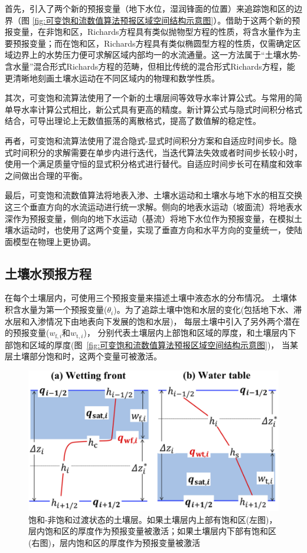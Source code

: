 首先，引入了两个新的预报变量（地下水位，湿润锋面的位置）来追踪饱和区的边界（图 \ref{fig:可变饱和流数值算法预报区域空间结构示意图}）。借助于这两个新的预报变量，在非饱和区，Richards方程具有类似抛物型方程的性质，将含水量作为主要预报变量；而在饱和区，Richards方程具有类似椭圆型方程的性质，仅需确定区域边界上的水势压力便可求解区域内部均一的水流通量。这一方法属于“土壤水势-含水量”混合形式Richards方程的范畴，但相比传统的混合形式Richards方程，能更清晰地刻画土壤水运动在不同区域内的物理和数学性质。

其次，可变饱和流算法使用了一个新的土壤层间等效导水率计算公式。与常用的简单导水率计算公式相比，新公式具有更高的精度。新计算公式与隐式时间积分格式结合，可导出理论上无数值振荡的离散格式，提高了数值解的稳定性。

再者，可变饱和流算法使用了混合隐式-显式时间积分方案和自适应时间步长。隐式时间积分的求解需要在单步内进行迭代，当迭代算法失效或者时间步长较小时，使用一个满足质量守恒的显式积分格式进行替代。自适应时间步长可在精度和效率之间做出合理的平衡。

最后，可变饱和流数值算法将地表入渗、土壤水运动和土壤水与地下水的相互交换这三个垂直方向的水流运动进行统一求解。侧向的地表水运动（坡面流）将地表水深作为预报变量，侧向的地下水运动（基流）将地下水位作为预报变量，在模拟土壤水运动时，也使用了这两个变量，实现了垂直方向和水平方向的变量统一，使陆面模型在物理上更协调。


\subsection{土壤水预报方程}
在每个土壤层内，可使用三个预报变量来描述土壤中液态水的分布情况。
土壤体积含水量为第一个预报变量($\theta_i$)。为了追踪土壤中饱和水层的变化(包括地下水、滞水层和入渗情况下由地表向下发展的饱和水层)，
每层土壤中引入了另外两个潜在的预报变量($w_{\mathrm{f},i}$和$w_{\mathrm{t},i}$)，
分别代表土壤层内上部饱和区域的厚度，和土壤层内下部饱和区域的厚度(图~\ref{fig:可变饱和流数值算法预报区域空间结构示意图})，
当某层土壤部分饱和时，这两个变量可被激活。
{
  \begin{figure}[htbp]
    \centering
    \includegraphics{Figures/陆地表面的水分循环/饱和-非饱和过渡状态的土壤层.png}
    \caption[饱和-非饱和过渡状态的土壤层]{饱和-非饱和过渡状态的土壤层。如果土壤层内上部有饱和区(左图)，
    层内饱和区的厚度作为预报变量被激活；如果土壤层内下部有饱和区(右图)，层内饱和区的厚度作为预报变量被激活}
    \label{fig:饱和-非饱和过渡状态的土壤层}
  \end{figure}
}

